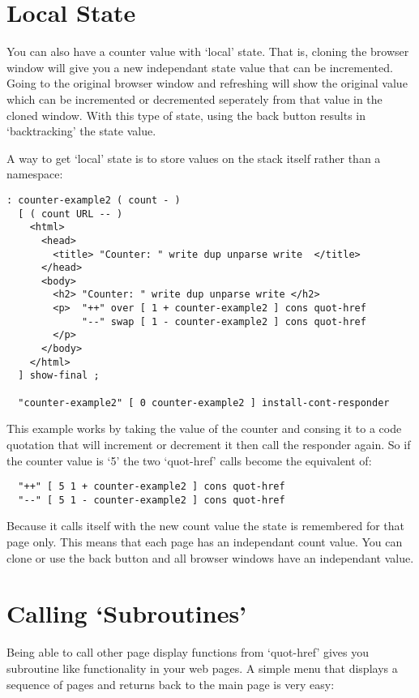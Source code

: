 \section{Local State}

You can also have a counter value with `local' state. That is, cloning
the browser window will give you a new independant state value that
can be incremented. Going to the original browser window and
refreshing will show the original value which can be incremented or
decremented seperately from that value in the cloned window. With this
type of state, using the back button results in `backtracking' the
state value.

A way to get `local' state is to store values on the stack itself
rather than a namespace:

\begin{verbatim}
: counter-example2 ( count - )
  [ ( count URL -- )
    <html>
      <head> 
        <title> "Counter: " write dup unparse write  </title>
      </head>
      <body>
        <h2> "Counter: " write dup unparse write </h2> 
        <p>  "++" over [ 1 + counter-example2 ] cons quot-href
             "--" swap [ 1 - counter-example2 ] cons quot-href
        </p>
      </body>
    </html>
  ] show-final ;

  "counter-example2" [ 0 counter-example2 ] install-cont-responder
\end{verbatim}

This example works by taking the value of the counter and consing it
to a code quotation that will increment or decrement it then call the
responder again. So if the counter value is `5' the two `quot-href'
calls become the equivalent of:

\begin{verbatim}
  "++" [ 5 1 + counter-example2 ] cons quot-href
  "--" [ 5 1 - counter-example2 ] cons quot-href
\end{verbatim}

Because it calls itself with the new count value the state is
remembered for that page only. This means that each page has an
independant count value. You can clone or use the back button and all
browser windows have an independant value.

\section{Calling `Subroutines'}

Being able to call other page display functions from `quot-href' gives
you subroutine like functionality in your web pages. A simple menu
that displays a sequence of pages and returns back to the main page is
very easy:

